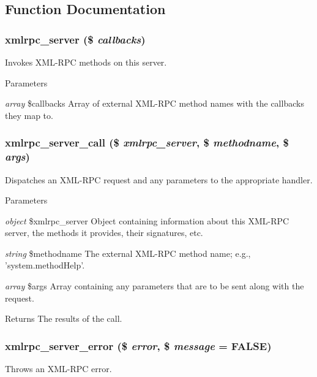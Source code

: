 \subsection{Function Documentation}
\hypertarget{xmlrpcs_8inc_aff1b954dfb418c8c13f2432e15a86dab}{
\subsubsection[{xmlrpc\_\-server}]{\setlength{\rightskip}{0pt plus 5cm}xmlrpc\_\-server (\$ {\em callbacks})}}
\label{xmlrpcs_8inc_aff1b954dfb418c8c13f2432e15a86dab}
Invokes XML-\/RPC methods on this server.


\begin{DoxyParams}{Parameters}
\item[{\em array}]\$callbacks Array of external XML-\/RPC method names with the callbacks they map to. \end{DoxyParams}
\hypertarget{xmlrpcs_8inc_a892eae4961430f05ba83b9e1cf522485}{
\subsubsection[{xmlrpc\_\-server\_\-call}]{\setlength{\rightskip}{0pt plus 5cm}xmlrpc\_\-server\_\-call (\$ {\em xmlrpc\_\-server}, \/  \$ {\em methodname}, \/  \$ {\em args})}}
\label{xmlrpcs_8inc_a892eae4961430f05ba83b9e1cf522485}
Dispatches an XML-\/RPC request and any parameters to the appropriate handler.


\begin{DoxyParams}{Parameters}
\item[{\em object}]\$xmlrpc\_\-server Object containing information about this XML-\/RPC server, the methods it provides, their signatures, etc. \item[{\em string}]\$methodname The external XML-\/RPC method name; e.g., 'system.methodHelp'. \item[{\em array}]\$args Array containing any parameters that are to be sent along with the request.\end{DoxyParams}
\begin{DoxyReturn}{Returns}
The results of the call. 
\end{DoxyReturn}
\hypertarget{xmlrpcs_8inc_a749a40314f46082a5106ad7d1d168cf0}{
\subsubsection[{xmlrpc\_\-server\_\-error}]{\setlength{\rightskip}{0pt plus 5cm}xmlrpc\_\-server\_\-error (\$ {\em error}, \/  \$ {\em message} = {\ttfamily FALSE})}}
\label{xmlrpcs_8inc_a749a40314f46082a5106ad7d1d168cf0}
Throws an XML-\/RPC error.


